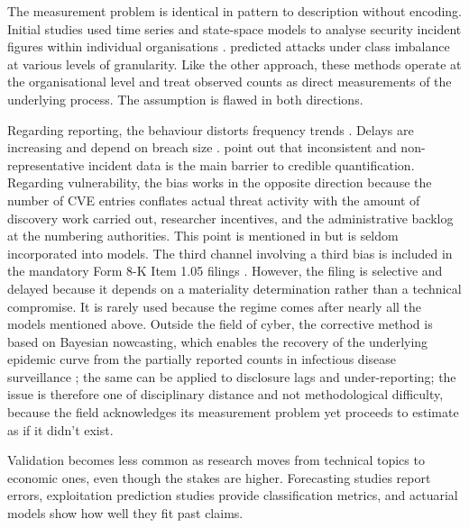 \documentclass[review]{elsarticle}
\begin{document}
The measurement problem is identical in pattern to description without encoding. Initial studies used time series and state-space models to analyse security incident figures within individual organisations \citep{condon2008}. \citet{okutan2018} predicted attacks under class imbalance at various levels of granularity. Like the other approach, these methods operate at the organisational level and treat observed counts as direct measurements of the underlying process. The assumption is flawed in both directions.

Regarding reporting, the behaviour distorts frequency trends \citep{edwards2016}. Delays are increasing and depend on breach size \citep{avanzi2025}. \citet{woods2021} point out that inconsistent and non-representative incident data is the main barrier to credible quantification. Regarding vulnerability, the bias works in the opposite direction because the number of CVE entries conflates actual threat activity with the amount of discovery work carried out, researcher incentives, and the administrative backlog at the numbering authorities. This point is mentioned in \citet{leverett2020} but is seldom incorporated into models. The third channel involving a third bias is included in the mandatory Form 8-K Item 1.05 filings \citep{block2025}. However, the filing is selective and delayed because it depends on a materiality determination rather than a technical compromise. It is rarely used because the regime comes after nearly all the models mentioned above. Outside the field of cyber, the corrective method is based on Bayesian nowcasting, which enables the recovery of the underlying epidemic curve from the partially reported counts in infectious disease surveillance \citep{hoehle2014};  the same can be applied to disclosure lags and under-reporting; the issue is therefore one of disciplinary distance and not methodological difficulty, because the field acknowledges its measurement problem yet proceeds to estimate as if it didn't exist.

Validation becomes less common as research moves from technical topics to economic ones, even though the stakes are higher. Forecasting studies report errors, exploitation prediction studies provide classification metrics, and actuarial models show how well they fit past claims.
\end{document}
